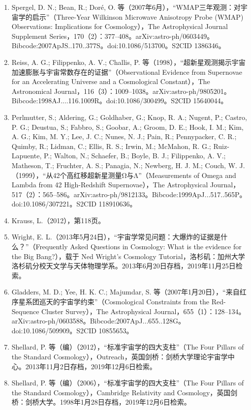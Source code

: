 \begin{enumerate}
\item Spergel, D. N.; Bean, R.; Doré, O. 等（2007年6月），“WMAP三年观测：对宇宙学的启示”（Three-Year Wilkinson Microwave Anisotropy Probe (WMAP) Observations: Implications for Cosmology），The Astrophysical Journal Supplement Series，170（2）：377–408。arXiv:astro-ph/0603449。Bibcode:2007ApJS..170..377S。doi:10.1086/513700。S2CID 1386346。  
\item Reiss, A. G.; Filippenko, A. V.; Challis, P. 等（1998），“超新星观测揭示宇宙加速膨胀与宇宙常数存在的证据”（Observational Evidence from Supernovae for an Accelerating Universe and a Cosmological Constant），The Astronomical Journal，116（3）：1009–1038。arXiv:astro-ph/9805201。Bibcode:1998AJ....116.1009R。doi:10.1086/300499。S2CID 15640044。  
\item Perlmutter, S.; Aldering, G.; Goldhaber, G.; Knop, R. A.; Nugent, P.; Castro, P. G.; Deustua, S.; Fabbro, S.; Goobar, A.; Groom, D. E.; Hook, I. M.; Kim, A. G.; Kim, M. Y.; Lee, J. C.; Nunes, N. J.; Pain, R.; Pennypacker, C. R.; Quimby, R.; Lidman, C.; Ellis, R. S.; Irwin, M.; McMahon, R. G.; Ruiz-Lapuente, P.; Walton, N.; Schaefer, B.; Boyle, B. J.; Filippenko, A. V.; Matheson, T.; Fruchter, A. S.; Panagia, N.; Newberg, H. J. M.; Couch, W. J.（1999），“从42个高红移超新星测量Ω与Λ”（Measurements of Omega and Lambda from 42 High-Redshift Supernovae），The Astrophysical Journal，517（2）：565–586。arXiv:astro-ph/9812133。Bibcode:1999ApJ...517..565P。doi:10.1086/307221。S2CID 118910636。
\item Krauss, L.（2012），第118页。  
\item Wright, E. L.（2013年5月24日），“宇宙学常见问题：大爆炸的证据是什么？”（Frequently Asked Questions in Cosmology: What is the evidence for the Big Bang?），载于 Ned Wright's Cosmology Tutorial，洛杉矶：加州大学洛杉矶分校天文学与天体物理学系。2013年6月20日存档，2019年11月25日检索。  
\item Gladders, M. D.; Yee, H. K. C.; Majumdar, S. 等（2007年1月20日），“来自红序星系团巡天的宇宙学约束”（Cosmological Constraints from the Red-Sequence Cluster Survey），The Astrophysical Journal，655（1）：128–134。arXiv:astro-ph/0603588。Bibcode:2007ApJ...655..128G。doi:10.1086/509909。S2CID 10855653。  
\item Shellard, P. 等（编）（2012），“标准宇宙学的四大支柱”（The Four Pillars of the Standard Cosmology），Outreach，英国剑桥：剑桥大学理论宇宙学中心。2013年11月2日存档，2019年12月6日检索。  
\item Shellard, P. 等（编）（2006），“标准宇宙学的四大支柱”（The Four Pillars of the Standard Cosmology），Cambridge Relativity and Cosmology，英国剑桥：剑桥大学。1998年1月28日存档，2019年12月6日检索。  

\end{enumerate}

